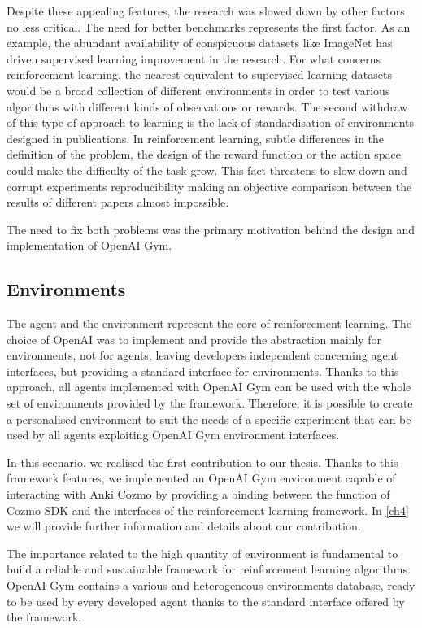 Despite these appealing features, the research was slowed down by other factors no less critical.
The need for better benchmarks represents the first factor. As an example, the abundant availability of conspicuous datasets like ImageNet \cite{deng2009imagenet} has driven supervised learning improvement in the research. For what concerns reinforcement learning, the nearest equivalent to supervised learning datasets would be a broad collection of different environments in order to test various algorithms with different kinds of observations or rewards.
The second withdraw of this type of approach to learning is the lack of standardisation of environments designed in publications. In reinforcement learning, subtle differences in the definition of the problem, the design of the reward function or the action space could make the difficulty of the task grow.  This fact threatens to slow down and corrupt experiments reproducibility making an objective comparison between the results of different papers almost impossible.

The need to fix both problems was the primary motivation behind the design and implementation of OpenAI Gym.

\subsection{Environments}

The agent and the environment represent the core of reinforcement learning. The choice of OpenAI was to implement and provide the abstraction mainly for environments, not for agents, leaving developers independent concerning agent interfaces, but providing a standard interface for environments. Thanks to this approach, all agents implemented with OpenAI Gym can be used with the whole set of environments provided by the framework. Therefore, it is possible to create a personalised environment to suit the needs of a specific experiment that can be used by all agents exploiting OpenAI Gym environment interfaces.

In this scenario, we realised the first contribution to our thesis. Thanks to this framework features, we implemented an OpenAI Gym environment capable of interacting with Anki Cozmo by providing a binding between the function of Cozmo SDK and the interfaces of the reinforcement learning framework. In \vref{ch4} we will provide further information and details about our contribution.

The importance related to the high quantity of environment is fundamental to build a reliable and sustainable framework for reinforcement learning algorithms. OpenAI Gym contains a various and heterogeneous environments database, ready to be used by every developed agent thanks to the standard interface offered by the framework.

